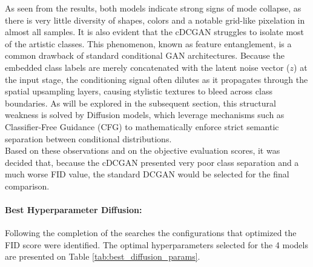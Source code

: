 \documentclass[runningheads]{llncs}
\begin{document}
\noindent
As seen from the results, both models indicate strong signs of mode collapse, as there is very little diversity of shapes, colors and a notable grid-like pixelation in almost all samples. It is also evident that the cDCGAN struggles to isolate most of the artistic classes. This phenomenon, known as feature entanglement, is a common drawback of standard conditional GAN architectures. Because the embedded class labels are merely concatenated with the latent noise vector ($z$) at the input stage, the conditioning signal often dilutes as it propagates through the spatial upsampling layers, causing stylistic textures to bleed across class boundaries. As will be explored in the subsequent section, this structural weakness is solved by Diffusion models, which leverage mechanisms such as Classifier-Free Guidance (CFG) to mathematically enforce strict semantic separation between conditional distributions.\\

\noindent
Based on these observations and on the objective evaluation scores, it was decided that, because the cDCGAN presented very poor class separation and a much worse FID value, the standard DCGAN would be selected for the final comparison.

\paragraph{\normalfont\textbf{Best Hyperparameter Diffusion:}} Following the completion of the searches the configurations that optimized the FID score were identified. The optimal hyperparameters selected for the 4 models are presented on Table \ref{tab:best_diffusion_params}.
\end{document}
